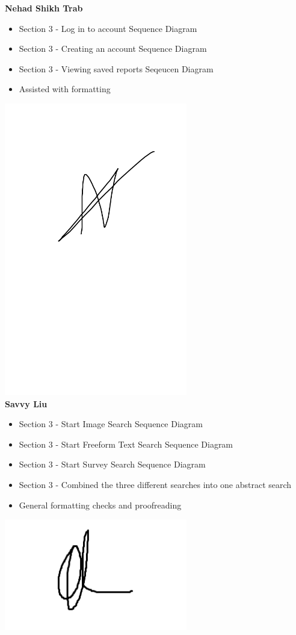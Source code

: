 \documentclass[]{article}
\numberwithin{figure}{section}
\begin{document}
\textbf{Nehad Shikh Trab}
\begin{itemize}
    \setlength\itemindent{2em}
    \item Section 3 - Log in to account Sequence Diagram
    \item Section 3 - Creating an account Sequence Diagram
    \item Section 3 - Viewing saved reports Seqeucen Diagram
    \item Assisted with formatting
\end{itemize}
\includegraphics[width=0.6\textwidth]{Nehad.png}
\\
\textbf{Savvy Liu}
\begin{itemize}
    \setlength\itemindent{2em}
    \item Section 3 - Start Image Search Sequence Diagram
    \item Section 3 - Start Freeform Text Search Sequence Diagram
    \item Section 3 - Start Survey Search Sequence Diagram
    \item Section 3 - Combined the three different searches into one abstract search
    \item General formatting checks and proofreading
\end{itemize} 
\includegraphics[width=0.6\textwidth]{Savvy.png}
\end{document}
